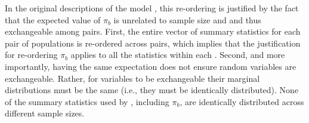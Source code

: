 In the original descriptions of the \msb model \cite{Hickerson2006,Huang2011},
this re-ordering is justified by the fact that the expected value of $\pi_b$ is
unrelated to sample size  and  and thus
exchangeable among pairs.
First, the entire vector of summary statistics \alignmentSS{}{} for each pair
of populations is re-ordered across pairs, which implies that the justification
for re-ordering $\pi_b$ applies to all the statistics within each
\alignmentSS{}{}.
Second, and more importantly, having the same expectation does not ensure
random variables are exchangeable.
Rather, for variables to be exchangeable their marginal distributions must be
the same (i.e., they must be identically distributed).
None of the summary statistics used by \msb, including $\pi_b$, are identically
distributed across different sample sizes.
